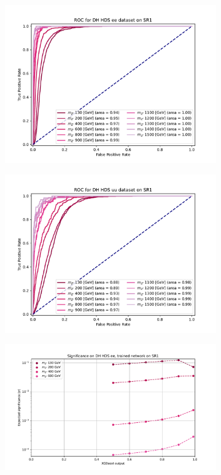 \documentclass[12pt, a4paper]{book}
\begin{document}
\begin{figure}[!ht]
\begin{subfigure}[b]{0.49\textwidth}
      \includegraphics[width=1\textwidth]{XGBoost/Model_independent/50-100/DH_HDS/ROC_ee.pdf}
   \end{subfigure}
   \hfill
   \begin{subfigure}[b]{0.49\textwidth}
      \centering
      \includegraphics[width=1\textwidth]{XGBoost/Model_independent/50-100/DH_HDS/ROC_uu.pdf}
   \end{subfigure}
   \hfill
	\begin{subfigure}[b]{0.49\textwidth}
      \centering
      \includegraphics[width=1\textwidth]{XGBoost/Model_independent/50-100/DH_HDS/EXP_SIG_ee.pdf}

\end{subfigure}
\end{figure}
\end{document}
